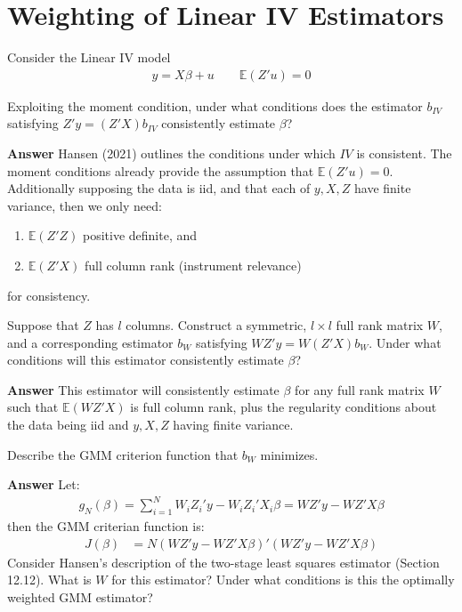 \documentclass[11pt]{exam}
\providecommand{\tightlist}{%
      \setlength{\itemsep}{0pt}\setlength{\parskip}{0pt}}
\begin{document}
    \hypertarget{weighting-of-linear-iv-estimators}{%
\section{Weighting of Linear IV
Estimators}\label{weighting-of-linear-iv-estimators}}

Consider the Linear IV model
\begin{align*}
y = X\beta + u \qquad\mathbb{E}(Z'u) = 0
\end{align*}

\begin{questions}
    \question Exploiting the moment condition, under what conditions does
the estimator \(b_{IV}\) satisfying \(Z'y = (Z'X)b_{IV}\) consistently
estimate \(\beta\)?

\textbf{Answer} Hansen (2021) outlines the conditions under which \(IV\)
is consistent. The moment conditions already provide the assumption that
\(\mathbb{E}(Z'u) = 0\). Additionally supposing the data is iid, and
that each of \(y, X, Z\) have finite variance, then we only need:

\begin{enumerate}
\def\labelenumi{\arabic{enumi}.}
\tightlist
\item
  \(\mathbb{E}(Z'Z)\) positive definite, and
\item
  \(\mathbb{E}(Z'X)\) full column rank (instrument relevance)
\end{enumerate}

for consistency.

    \question Suppose that \(Z\) has \(l\) columns. Construct a
symmetric, \(l\times l\) full rank matrix \(W\), and a corresponding
estimator \(b_W\) satisfying \(WZ'y = W(Z'X)b_W\). Under what conditions
will this estimator consistently estimate \(\beta\)?

\textbf{Answer} This estimator will consistently estimate \(\beta\) for
any full rank matrix \(W\) such that \(\mathbb{E}(WZ'X)\) is full column
rank, plus the regularity conditions about the data being iid and
\(y, X, Z\) having finite variance.

    \question Describe the GMM criterion function that $b_W$ minimizes.

\textbf{Answer} Let:
\begin{align*}
g_N(\beta) = \sum_{i=1}^N W_iZ_i'y - W_iZ_i'X_i\beta = WZ'y - WZ'X\beta
\end{align*}
then the GMM criterian function is:
\begin{align*}
J(\beta) &= N(WZ'y - WZ'X\beta)'(WZ'y - WZ'X\beta)
\end{align*}
\question Consider Hansen’s description of the two-stage least squares estimator (Section 12.12). What is $W$ for this estimator? Under what conditions is this the optimally weighted GMM estimator?


\end{questions}
\end{document}
